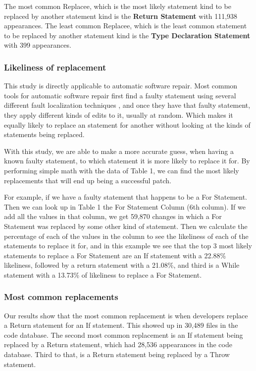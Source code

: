 \documentclass{sig-alternate-05-2015}
\begin{document}
The most common Replacee, which is the most likely statement kind to be replaced by another statement kind is the \textbf{Return Statement} with 111,938 appearances. The least common Replacee, which is the least common statement to be replaced by another statement kind is the \textbf{Type Declaration Statement} with 399 appearances.

\subsubsection{Likeliness of replacement}
This study is directly applicable to automatic software repair. Most common tools for automatic software repair \cite{dongsun}\cite{weimer}\cite{claire} first find a faulty statement using several different fault localization techniques \cite{zach}, and once they have that faulty statement, they apply different kinds of edits to it, usually at random. Which makes it equally likely to replace an statement for another without looking at the kinds of statements being replaced.

With this study, we are able to make a more accurate guess, when having a known faulty statement, to which statement it is more likely to replace it for. By performing simple math with the data of Table 1, we can find the most likely replacements that will end up being a successful patch. 

For example, if we have a faulty statement that happens to be a For Statement. Then we can look up in Table 1 the For Statement Column (6th column). If we add all the values in that column, we get 59,870 changes in which a For Statement was replaced by some other kind of statement. Then we calculate the percentage of each of the values in the column to see the likeliness of each of the statements to replace it for, and in this example we see that the top 3 most likely statements to replace a For Statement are an If statement with a 22.88\% likeliness, followed by a return statement with a 21.08\%, and third is a While statement with a 13.73\% of likeliness to replace a For Statement.


\subsubsection{Most common replacements}
Our results show that the most common replacement is when developers replace a Return statement for an If statement. This showed up in 30,489 files in the code database. The second most common replacement is an If statement being replaced by a Return statement, which had 28,536 appearances in the code database. Third to that, is a Return statement being replaced by a Throw statement.
\end{document}
